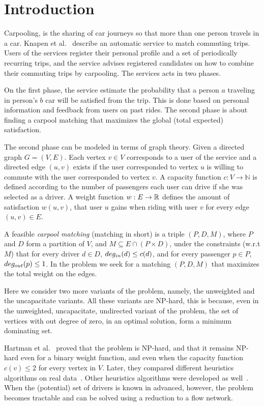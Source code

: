 \section{Introduction}
Carpooling, is the sharing of car journeys so that more than one person travels
in a car.
Knapen et al.~\cite{knapen2013estimating} describe an automatic service
to match commuting trips.
Users of the services register their personal profile and a set of periodically
recurring trips, 
and the service advises registered candidates on how to combine their commuting
trips by carpooling.
The services acts in two phases. 

On the first phase, the service estimate the probability that a person $a$
traveling in person's $b$ car will be satisfied from the trip.
This is done based on personal information and feedback from users on past
rides.
The second phase is about finding a carpool matching
that maximizes the global (total expected) satisfaction.

The second phase can be modeled in terms of graph theory.
Given a directed graph $G = (V, E)$.
Each vertex $v \in V$ corresponds to a user of the service and a directed
edge $(u, v)$ exists if the user corresponded to vertex $u$ is willing to
commute with the user corresponded to vertex $v$.
A capacity function $ c: V \rightarrow \mathbb{N} $ is defined
according to the number of passengers each user can drive if she was
selected as a driver.
A weight function $w : E \rightarrow \mathbb{R} $ defines the amount of
satisfaction $w(u, v)$,
that user $u$ gains when riding with user $v$ for every edge $(u, v) \in E$.

A feasible \emph{carpool matching} (matching in short) is a triple 
$(P, D, M)$, where $P$ and $D$ form a partition of $V$, and 
$M \subseteq E \cap (P \times D)$,
under the constraints (w.r.t $M$) that for every driver $d \in D$, 
$deg_{in}(d) \leq c(d)$, 
and for every passenger $p \in P$, $deg_{out}(p) \leq 1$.
In the \textsc{\CARPOOL{}} problem we seek for a matching $(P, D, M)$ that maximizes the
total weight on the edges.

Here we consider two more variants of the problem, namely, 
the unweighted and the uncapacitate variants.
All these variants are NP-hard, this is because, 
even in the unweighted, uncapacitate, undirected variant of the problem, 
the set of vertices with out degree of zero, in an optimal solution, 
form a minimum dominating set.  
  
Hartman et al.~\cite{hartman2013optimal} proved that the \emph{\CARPOOL{}} problem is
NP-hard, and that it remains NP-hard even for a binary weight function, and even when
the capacity function $c(v) \leq 2$ for every vertex in $V$.
Later, they compared different heuristics algorithms on real data~\cite{hartman2014theory}.
Other heuristics algorithms were developed as well~\cite{knapen2014exploiting}.
When the (potential) set of drivers is known in advanced, however, the problem becomes
tractable and can be solved using a reduction to a flow network.

